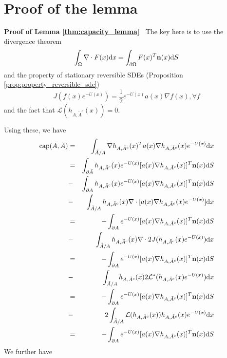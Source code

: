 \documentclass[english, aip, jcp, priprint, graphicx]{revtex4-1}
\newcommand{\mathd}{\mathrm{d}}
\newcommand{\tmop}[1]{\ensuremath{\operatorname{#1}}}
\theoremstyle{plain}
\theoremstyle{definition}
\theoremstyle{plain}
\begin{document}
\section{Proof of the lemma}\label{sec:proof_lemma}

\noindent\textbf{Proof of Lemma \ref{thm:capacity_lemma}\ }
The key here is to use the divergence theorem
\[ \int_{\Omega} \nabla \cdot F (x) \mathd x = \int_{\partial \Omega} F (x)^T
{\textbf n} (x) \mathd S \]
and the property of stationary reversible SDEs (Proposition \ref{prop:property_reversible_sde})
\[ J (f (x) e^{- U (x)}) = \frac{1}{2} e^{- U (x)} a (x) \nabla f (x), \forall f \]
and the fact that $\mathcal{L} (h_{A, \tilde{A}^c} (x)) = 0$.

Using these, we have
\begin{eqnarray*}
\tmop{cap} (A, \tilde{A}) & = & \int_{\tilde{A} / A} \nabla h_{A,
\tilde{A}^c} (x)^T a (x) \nabla h_{A, \tilde{A}^c} (x) e^{- U (x)} \mathd
x\\
& = & \int_{\partial \tilde{A}} h_{A, \tilde{A}^c} (x) e^{- U (x)} [a (x)
\nabla h_{A, \tilde{A}^c} (x)]^T {\textbf n} (x) \mathd S\\
& - & \int_{\partial A} h_{A, \tilde{A}^c} (x) e^{- U (x)} [a (x) \nabla
h_{A, \tilde{A}^c} (x)]^T {\textbf n} (x) \mathd S\\
& - & \int_{\tilde{A} / A} h_{A, \tilde{A}^c} (x) \nabla \cdot [a (x)
\nabla h_{A, \tilde{A}^c} (x) e^{- U (x)}] \mathd x\\
& = & - \int_{\partial A} e^{- U (x)} [a (x) \nabla h_{A, \tilde{A}^c}
(x)]^T {\textbf n} (x) \mathd S\\
& - & \int_{\tilde{A} / A} h_{A, \tilde{A}^c} (x) \nabla \cdot 2 J (h_{A,
\tilde{A}^c} (x) e^{- U (x)}) \mathd x\\
& = & - \int_{\partial A} e^{- U (x)} [a (x) \nabla h_{A, \tilde{A}^c}
(x)]^T {\textbf n} (x) \mathd S\\
& - & \int_{\tilde{A} / A} h_{A, \tilde{A}^c} (x) 2 \mathcal{L}^{\ast}
(h_{A, \tilde{A}^c} (x) e^{- U (x)}) \mathd x\\
& = & - \int_{\partial A} e^{- U (x)} [a (x) \nabla h_{A, \tilde{A}^c}
(x)]^T {\textbf n} (x) \mathd S\\
& - & 2 \int_{\tilde{A} / A} \mathcal{L} (h_{A, \tilde{A}^c} (x)) h_{A,
\tilde{A}^c} (x) e^{- U (x)} \mathd x\\
& = & - \int_{\partial A} e^{- U (x)} [a (x) \nabla h_{A, \tilde{A}^c}
(x)]^T {\textbf n} (x) \mathd S
\end{eqnarray*}
We further have
\end{document}
